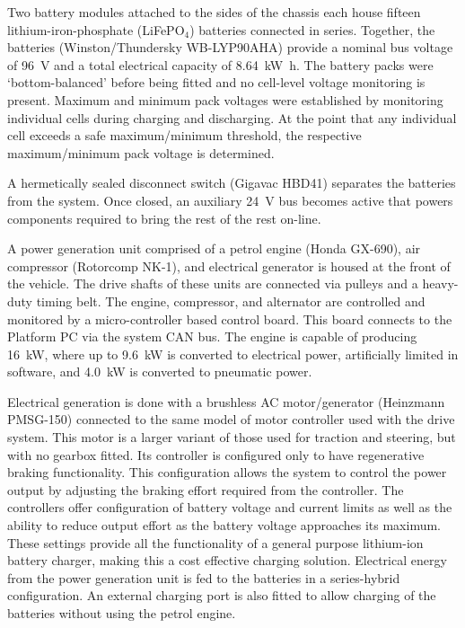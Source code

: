 \documentclass[preprint,authoryear,12pt]{elsarticle}
\begin{document}
        Two battery modules attached to the sides of the chassis each house fifteen lithium-iron-phosphate (LiFePO$_{\text{4}}$) batteries connected in series.
        Together, the batteries (Winston/Thundersky WB-LYP90AHA) provide a nominal bus voltage of \SI{96}{\volt} and a total electrical capacity of \SI{8.64}{\kilo\watt\hour}.
        The battery packs were `bottom-balanced' before being fitted and no cell-level voltage monitoring is present.
        Maximum and minimum pack voltages were established by monitoring individual cells during charging and discharging.
        At the point that any individual cell exceeds a safe maximum/minimum threshold, the respective maximum/minimum pack voltage is determined.

        A hermetically sealed disconnect switch (Gigavac HBD41) separates the batteries from the system.
        Once closed, an auxiliary \SI{24}{\volt} bus becomes active that powers components required to bring the rest of the rest on-line.

        A power generation unit comprised of a petrol engine (Honda GX-690), air compressor (Rotorcomp NK-1), and electrical generator is housed at the front of the vehicle.
        The drive shafts of these units are connected via pulleys and a heavy-duty timing belt.
        The engine, compressor, and alternator are controlled and monitored by a micro-controller based control board.
        This board connects to the Platform PC via the system CAN bus.
        The engine is capable of producing \SI{16}{\kilo\watt}, where up to \SI{9.6}{\kilo\watt} is converted to electrical power, artificially limited in software, and \SI{4.0}{\kilo\watt} is converted to pneumatic power.

        Electrical generation is done with a brushless AC motor/generator (Heinzmann PMSG-150) connected to the same model of motor controller used with the drive system.
        This motor is a larger variant of those used for traction and steering, but with no gearbox fitted.
        Its controller is configured only to have regenerative braking functionality.
        This configuration allows the system to control the power output by adjusting the braking effort required from the controller.
        The controllers offer configuration of battery voltage and current limits as well as the ability to reduce output effort as the battery voltage approaches its maximum.
        These settings provide all the functionality of a general purpose lithium-ion battery charger, making this a cost effective charging solution.
        Electrical energy from the power generation unit is fed to the batteries in a series-hybrid configuration.
        An external charging port is also fitted to allow charging of the batteries without using the petrol engine.
\end{document}
